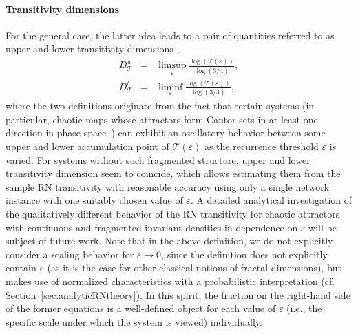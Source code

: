 		\paragraph{Transitivity dimensions}
		For the general case, the latter idea leads to a pair of quantities referred to as upper and lower transitivity dimensions \cite{Donner2011b},
\begin{eqnarray}
D_{\mathcal{T}}^u &=& \limsup_{\varepsilon} \frac{\log(\mathcal{T}(\varepsilon))}{\log(3/4)}, \label{eq:dtu} \\
D_{\mathcal{T}}^l &=& \liminf_{\varepsilon} \frac{\log(\mathcal{T}(\varepsilon))}{\log(3/4)}, \label{eq:dtl}
\end{eqnarray}
\noindent
where the two definitions originate from the fact that certain systems (in particular, chaotic maps whose attractors form Cantor sets in at least one direction in phase space~\cite{Donner2011b}) can exhibit an oscillatory behavior between some upper and lower accumulation point of $\mathcal{T}(\varepsilon)$ as the recurrence threshold $\varepsilon$ is varied. For systems without such fragmented structure, upper and lower transitivity dimension seem to coincide, which allows estimating them from the sample RN transitivity with reasonable accuracy using only a single network instance with one suitably chosen value of $\varepsilon$. A detailed analytical investigation of the qualitatively different behavior of the RN transitivity for chaotic attractors with continuous and fragmented invariant densities in dependence on $\varepsilon$ will be subject of future work. Note that in the above definition, we do not explicitly consider a scaling behavior for $\varepsilon\to 0$, since the definition does not explicitly contain $\varepsilon$ (as it is the case for other classical notions of fractal dimensions), but makes use of normalized characteristics with a probabilistic interpretation (cf. Section~\ref{sec:analyticRNtheory}). In this spirit, the fraction on the right-hand side of the former equations is a well-defined object for each value of $\varepsilon$ (i.e., the specific scale under which the system is viewed) individually.

